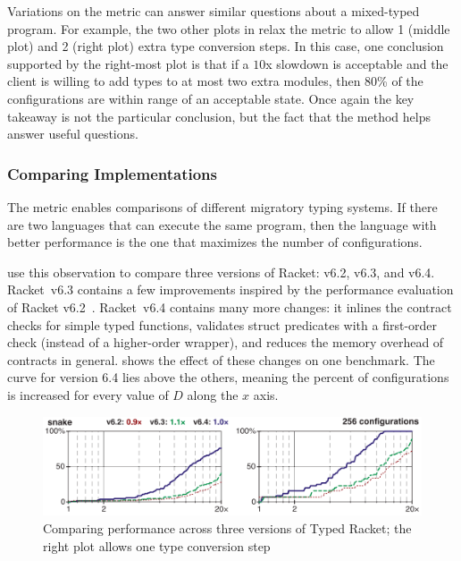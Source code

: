 Variations on the  metric can answer similar questions
 about a mixed-typed program.
For example, the two other plots in 
 relax the metric to allow 1 (middle plot) and 2 (right plot) extra type
 conversion steps.
In this case, one conclusion supported by the right-most plot is that
 if a $10$x slowdown is acceptable and the client is willing to add types
 to at most two extra modules, then 80\% of the configurations are within
 range of an acceptable state.
Once again the key takeaway is not the particular conclusion,
 but the fact that the method helps answer useful questions.


\subsubsection{Comparing Implementations}

The  metric enables comparisons of different migratory
 typing systems.
If there are two languages that can execute the same program,
 then the language with better performance is the one that maximizes the
 number of  configurations.

\citet{gtnffvf-jfp-2019} use this observation to compare three versions
 of Racket: v6.2, v6.3, and v6.4.
Racket~v6.3 contains a few improvements inspired by the performance
 evaluation of Racket v6.2~\cite{tfgnvf-popl-2016}.
Racket~v6.4 contains many more changes:
 it inlines the contract checks for simple typed functions,
 validates struct predicates with a first-order check (instead of a higher-order wrapper),
 and reduces the memory overhead of contracts in general.
 shows the effect of these changes on one benchmark.
The curve for version 6.4 lies above the others, meaning the percent of
  configurations is increased for every value of $D$ along
 the $x$ axis.

\begin{figure}[ht]
\includegraphics[width=0.8\columnwidth]{src/snake-jfp.png}
\caption{Comparing performance across three versions of Typed Racket; the right plot allows one type conversion step}
\label{fig:snake-jfp}
\end{figure}

